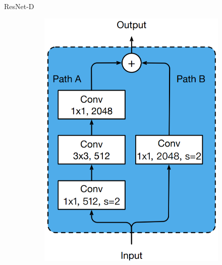 \begin{frame}{ResNet-D}
\begin{figure}[H]
    \centering
    \begin{subfigure}[b]{0.25\textwidth}
        \centering
        \includegraphics[width=\textwidth]{img/01-downsampling.png}
        \label{fig:skip1}
    \end{subfigure}
    \hspace{1cm}
    \begin{subfigure}[b]{0.25\textwidth}
        \centering

\end{subfigure}
\end{figure}
\end{frame}
